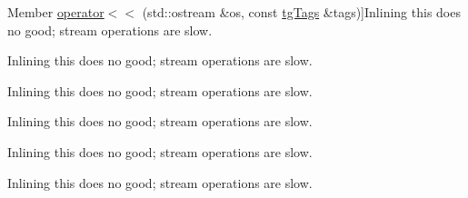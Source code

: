 \begin{DoxyRefList}
Member \hyperlink{tg_tags_8h_a3135a1c3f766cd0447e091921e8e35f2}{operator$<$$<$} (std\-::ostream \&os, const \hyperlink{classtg_tags}{tg\-Tags} \&tags)]Inlining this does no good; stream operations are slow.  
\item[\label{todo__todo000078}%
\hypertarget{todo__todo000078}{}%
Member \hyperlink{tg_connector_info_8h_a0b0b1dbea568b35e9ba79033879ce756}{operator$<$$<$} (std\-::ostream \&os, const \hyperlink{classtg_connector_info}{tg\-Connector\-Info} \&n)]Inlining this does no good; stream operations are slow.  
\item[\label{todo__todo000080}%
\hypertarget{todo__todo000080}{}%
Member \hyperlink{tg_node_8h_a061685aa319efb6f9275eba40a6edbcd}{operator$<$$<$} (std\-::ostream \&os, const \hyperlink{classtg_node}{tg\-Node} \&node)]Inlining this does no good; stream operations are slow.  
\item[\label{todo__todo000088}%
\hypertarget{todo__todo000088}{}%
Member \hyperlink{tg_pair_8h_ae8e6492e87247281b154f70ff334eee9}{operator$<$$<$} (std\-::ostream \&os, const \hyperlink{classtg_pair}{tg\-Pair} \&pair)]Inlining this does no good; stream operations are slow.  
\item[\label{todo__todo000090}%
\hypertarget{todo__todo000090}{}%
Member \hyperlink{tg_pairs_8h_aa0303a85ae4164c1f2c0d3fcd4003406}{operator$<$$<$} (std\-::ostream \&os, const \hyperlink{classtg_pairs}{tg\-Pairs} \&p)]Inlining this does no good; stream operations are slow.  
\item[\label{todo__todo000091}%
\hypertarget{todo__todo000091}{}%
Member \hyperlink{tg_rigid_info_8h_a571cc463bc11aac00c2f6acc6f8b39ba}{operator$<$$<$} (std\-::ostream \&os, const \hyperlink{classtg_rigid_info}{tg\-Rigid\-Info} \&obj)]Inlining this does no good; stream operations are slow. 


\end{DoxyRefList}

